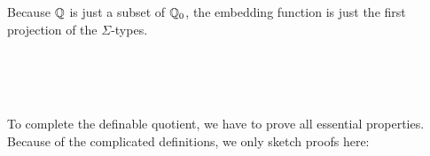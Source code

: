 \begin{code}\>\<%
\\
\>\AgdaFunction{[\_]} \AgdaSymbol{:}   \<%
\\
\>\AgdaFunction{[} \AgdaSymbol{(}\AgdaInductiveConstructor{+} \AgdaSymbol{)}   \AgdaFunction{]} \AgdaSymbol{=}   \AgdaSymbol{(} \AgdaSymbol{)}  \AgdaSymbol{())}\<%
\\
\>\AgdaFunction{[} \AgdaSymbol{(} \AgdaSymbol{)}   \AgdaFunction{]} \AgdaSymbol{=} \AgdaFunction{-}  \AgdaSymbol{(} \AgdaSymbol{)} \AgdaSymbol{(} \AgdaSymbol{)}  \AgdaSymbol{())}\<%
\\
\>\<\end{code}

Because $\mathbb{Q}$ is just a subset of $\mathbb{Q}_0$, the embedding function is just the first projection of the $\Sigma$-types.

\begin{code}\>\<%
\\
\> \AgdaSymbol{:}   \<%
\\
\> \AgdaSymbol{=} \<%
\\
\>\<\end{code}

To complete the definable quotient, we have to prove all essential properties. Because of the complicated definitions, we only sketch proofs here:

